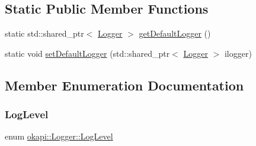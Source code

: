 \subsection*{Static Public Member Functions}
\begin{DoxyCompactItemize}
\item 
static std\+::shared\+\_\+ptr$<$ \mbox{\hyperlink{classokapi_1_1Logger}{Logger}} $>$ \mbox{\hyperlink{classokapi_1_1Logger_a5053cf778b4b55acba788a3797dc96d2}{get\+Default\+Logger}} ()
\item 
static void \mbox{\hyperlink{classokapi_1_1Logger_a8ce00328c5d878bb340cf360694b103c}{set\+Default\+Logger}} (std\+::shared\+\_\+ptr$<$ \mbox{\hyperlink{classokapi_1_1Logger}{Logger}} $>$ ilogger)
\end{DoxyCompactItemize}


\subsection{Member Enumeration Documentation}
\mbox{\label{classokapi_1_1Logger_a66826a92c568743a2722d3c3f6887d81}} 
\subsubsection{\texorpdfstring{LogLevel}{LogLevel}}
{\footnotesize\ttfamily enum \mbox{\hyperlink{classokapi_1_1Logger_a66826a92c568743a2722d3c3f6887d81}{okapi\+::\+Logger\+::\+Log\+Level}}\hspace{0.3cm}{\ttfamily [strong]}}

